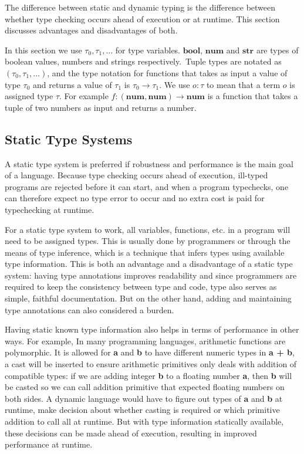 The difference between static and dynamic typing is the difference
between whether type checking occurs ahead of execution or at runtime.
This section discusses advantages and disadvantages of both.

\newcommand{\tnum}{\textbf{num}}
\newcommand{\tstr}{\textbf{str}}
\newcommand{\tbool}{\textbf{bool}}
\newcommand{\tarr}[2]{#1 \rightarrow #2}

In this section we use $\tau_0, \tau_1, \ldots$ for type variables.
$\tbool$, $\tnum$ and $\tstr$ are types of
boolean values, numbers and strings respectively.\
Tuple types are notated as $(\tau_0, \tau_1, \ldots)$,
and the type notation for functions that takes as input a value of type $\tau_0$
and returns a value of $\tau_1$ is $\tarr{\tau_0}{\tau_1}$.
We use $o : \tau$ to mean that a term $o$ is assigned type $\tau$.
For example $f : \tarr{(\tnum, \tnum)}{\tnum}$ is a function that
takes a tuple of two numbers as input and returns a number.

\subsection{Static Type Systems}


A static type system is preferred if robustness and performance
is the main goal of a language.
Because type checking occurs ahead of execution,
ill-typed programs are rejected before it can start, and
when a program typechecks,
one can therefore expect no type error to occur and
no extra cost is paid for typechecking at runtime.

For a static type system to work, all variables, functions, etc. in a program
will need to be assigned types. This is usually done by programmers or through the
means of type inference, which is a technique that infers types using
available type information. This is both an advantage and a disadvantage
of a static type system: having type annotations improves readability
and since programmers are required to keep the consistency between type and code,
type also serves as simple, faithful documentation. But on the other hand,
adding and maintaining type annotations can also considered a burden.

Having static known type information also helps in terms of performance in other ways.
For example, In many programming languages, arithmetic functions are polymorphic.
It is allowed for \textbf{a} and \textbf{b} to have different numeric types in \textbf{a + b}, a cast will be inserted to ensure arithmetic primitives only deals with addition of compatible types: if we are adding integer \textbf{b} to a floating number \textbf{a}, then \textbf{b} will be casted so we can call addition primitive that expected floating numbers on both sides.
A dynamic language would have to figure out types of \textbf{a} and \textbf{b} at runtime, make decision about whether casting is required or which primitive addition to call all at runtime. But with type information statically available,
these decisions can be made ahead of execution,
resulting in improved performance at runtime.

